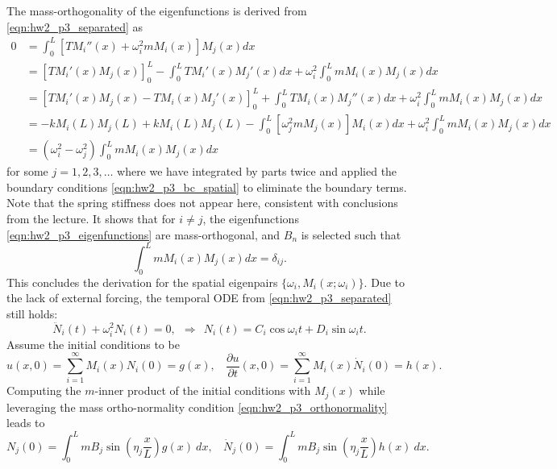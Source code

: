 The mass-orthogonality of the eigenfunctions is derived from \cref{eqn:hw2_p3_separated} as 
\begin{equation}\label{eqn:hw2_p3_orthogonal_proof}
\begin{aligned}
    0 &= \int_0^L \left[ T M_i''(x) + \omega_i^2 m M_i(x) \right] M_j(x) dx \\
    &= {\left[ T M_i'(x) M_j(x) \right]}_0^L - \int_0^L T M_i'(x) M_j'(x) dx + \omega_i^2  \int_0^L m M_i(x) M_j(x) dx \\
    & = {\left[ T M_i'(x) M_j(x) - T M_i(x)M_j'(x)\right]}_0^L + \int_0^L T M_i(x) M_j''(x) dx + \omega_i^2  \int_0^L m M_i(x) M_j(x) dx \\
    &= -kM_i(L)M_j(L) + kM_i(L)M_j(L) - \int_0^L \left[\omega_j^2 m M_j(x)\right] M_i(x) dx + \omega_i^2\int_0^L m M_i(x) M_j(x) dx \\ 
    &= (\omega_i^2 - \omega_j^2) \int_0^L m M_i(x) M_j(x) dx
\end{aligned}
\end{equation}
for some $j = 1, 2, 3, \ldots$ where we have integrated by parts twice and applied the boundary conditions \cref{eqn:hw2_p3_bc_spatial} to eliminate the boundary terms. 
Note that the spring stiffness does not appear here, consistent with conclusions from the lecture. 
It shows that for $i \neq j$, the eigenfunctions \cref{eqn:hw2_p3_eigenfunctions} are mass-orthogonal, and $B_n$ is selected such that
\begin{equation}\label{eqn:hw2_p3_orthonormality}
    \int_0^L m M_i(x) M_j(x) dx = \delta_{ij}.
\end{equation}
This concludes the derivation for the spatial eigenpairs $\{\omega_i, M_i(x; \omega_i)\}$. 
Due to the lack of external forcing, the temporal ODE from \cref{eqn:hw2_p3_separated} still holds:
\begin{equation}
    \ddot{N}_i(t) + \omega_i^2 N_i(t) = 0, ~~ \Rightarrow ~~ N_i(t) = C_i \cos\omega_i t + D_i \sin\omega_i t.
\end{equation}
Assume the initial conditions to be 
\begin{equation}
    u(x, 0) = \sum_{i=1}^\infty M_i(x) N_i(0)= g(x), ~~~~ \frac{\partial u}{\partial t}(x, 0) = \sum_{i=1}^\infty M_i(x) \dot{N}_i(0) = h(x).
\end{equation}
Computing the $m$-inner product of the initial conditions with $M_j(x)$ while leveraging the mass ortho-normality condition \cref{eqn:hw2_p3_orthonormality} leads to 
\begin{equation}
    N_j(0) = \int_0^L m B_j \sin \left(\eta_j \frac{x}{L} \right)g(x) ~dx, ~~~~ \dot{N}_j(0) = \int_0^L m B_j \sin \left(\eta_j \frac{x}{L} \right) h(x) ~dx.
\end{equation}
